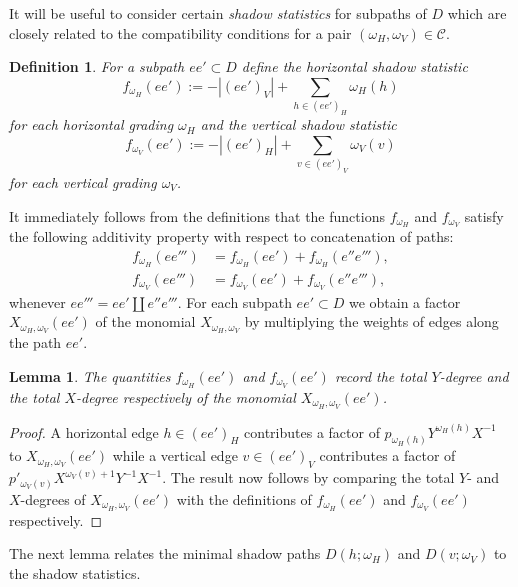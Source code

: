 \documentclass{amsart}
\newtheorem{definition}[theorem]{Definition}
\newtheorem{lemma}[theorem]{Lemma}
\newcommand{\cC}{\mathcal{C}}
\begin{document}
 It will be useful to consider certain \emph{shadow statistics} for subpaths of $D$ which are closely related to the compatibility conditions for a pair $(\omega_H,\omega_V)\in\cC$.  
 \begin{definition}\label{def:shadow statistics}
  For a subpath $ee'\subset D$ define the \emph{horizontal shadow statistic}
  \[f_{\omega_H}(ee'):=-|(ee')_V|+\sum\limits_{h\in(ee')_H}\omega_H(h)\]
  for each horizontal grading $\omega_H$ and the \emph{vertical shadow statistic}
  \[f_{\omega_V}(ee'):=-|(ee')_H|+\sum\limits_{v\in(ee')_V}\omega_V(v)\]
  for each vertical grading $\omega_V$.  
 \end{definition}
 It immediately follows from the definitions that the functions $f_{\omega_H}$ and $f_{\omega_V}$ satisfy the following additivity property with respect to concatenation of paths:
 \begin{align*}
  f_{\omega_H}(ee''')&=f_{\omega_H}(ee')+f_{\omega_H}(e''e'''),\\
  f_{\omega_V}(ee''')&=f_{\omega_V}(ee')+f_{\omega_V}(e''e'''),
 \end{align*}
 whenever $ee'''=ee'\amalg e''e'''$.  For each subpath $ee'\subset D$ we obtain a factor $X_{\omega_H,\omega_V}(ee')$ of the monomial $X_{\omega_H,\omega_V}$ by multiplying the weights of edges along the path $ee'$.
 \begin{lemma}
  The quantities $f_{\omega_H}(ee')$ and $f_{\omega_V}(ee')$ record the total $Y$-degree and the total $X$-degree respectively of the monomial $X_{\omega_H,\omega_V}(ee')$.
 \end{lemma}
 \begin{proof}
  A horizontal edge $h\in(ee')_H$ contributes a factor of $p_{\omega_H(h)}Y^{\omega_H(h)}X^{-1}$ to $X_{\omega_H,\omega_V}(ee')$ while a vertical edge $v\in(ee')_V$ contributes a factor of $p'_{\omega_V(v)}X^{\omega_V(v)+1}Y^{-1}X^{-1}$.  The result now follows by comparing the total $Y$- and $X$-degrees of $X_{\omega_H,\omega_V}(ee')$ with the definitions of $f_{\omega_H}(ee')$ and $f_{\omega_V}(ee')$ respectively.
 \end{proof}
 The next lemma relates the minimal shadow paths $D(h;\omega_H)$ and $D(v;\omega_V)$ to the shadow statistics.
\end{document}
